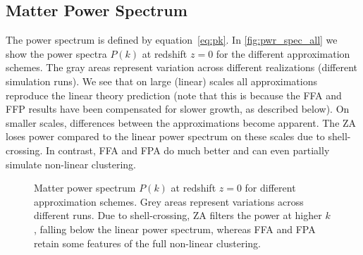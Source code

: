 \subsection{Matter Power Spectrum}
\label{sec:pwr_spec}
The power spectrum is defined by equation~\eqref{eq:pk}. In \autoref{fig:pwr_spec_all} we show the power spectra $P(k)$ at redshift $z=0$ for the different approximation schemes. The gray areas represent variation across different realizations (different simulation runs). We see that on large (linear) scales all approximations reproduce the linear theory prediction (note that this is because the FFA and FFP results have been compensated for slower growth, as described below). On smaller scales, differences between the approximations become apparent. The ZA loses power compared to the linear power spectrum on these scales due to shell-crossing. In contrast, FFA and FPA do much better and can even partially simulate non-linear clustering.

\begin{figure}[hbt]
\centering
	\begin{subfigure}{0.9\textwidth}
	\end{subfigure}
	\begin{subfigure}{0.9\textwidth}
	\end{subfigure}%
    \caption{Matter power spectrum $P(k)$ at redshift $z=0$ for different approximation schemes. Grey areas represent variations across different runs. Due to shell-crossing, ZA filters the power at higher $k$, falling below the linear power spectrum, whereas FFA and FPA retain some features of the full non-linear clustering.}
    \label{fig:pwr_spec_all}
\end{figure}

